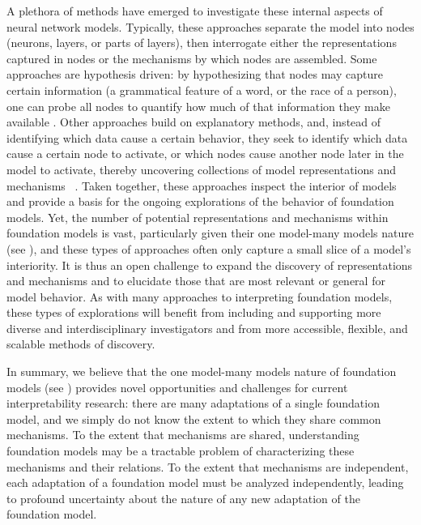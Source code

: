 A plethora of methods have emerged to investigate these internal aspects of neural network models. Typically, these approaches separate the model into nodes (\eg neurons, layers, or parts of layers), then interrogate either the representations captured in nodes or the mechanisms by which nodes are assembled. 
Some approaches are hypothesis driven: by hypothesizing that nodes may capture certain information (\eg a grammatical feature of a word, or the race of a person), one can probe all nodes to quantify how much of that information they make available \citep{alain2016understanding,veldhoen2016diagnostic,belinkov2017what,adi2017finegrained,conneau2018what,hewitt2019control,hewitt2019structural,voita2020informationtheoretic,pimentel2020information}. 
Other approaches build on explanatory methods, and, instead of identifying which data cause a certain behavior, they seek to identify which data cause a certain node to activate, or which nodes cause another node later in the model to activate, thereby uncovering collections of model representations and mechanisms
~\citep{olah2020zoom,mu2020compositional,carter2019activation,goh2021multimodal}.
Taken together, these approaches inspect the interior of models and provide a %
basis for the ongoing explorations of the behavior of foundation models. 
Yet, the number of potential representations and mechanisms within foundation models is vast, particularly given their one model-many models nature (see ), and these types of approaches often only capture a small slice of a model's interiority.
It is thus an open challenge to expand the discovery of representations and mechanisms and to elucidate those that are most relevant or general for model behavior.
As with many approaches to interpreting foundation models, these types of explorations will benefit from including and supporting more diverse and interdisciplinary investigators and from  more accessible, flexible, and scalable methods of discovery.


In summary, we believe that the one model-many models nature of foundation models (see ) provides novel opportunities and challenges for current interpretability research: there are many adaptations of a single foundation model, and we simply do not know the extent to which they share common mechanisms.
To the extent that mechanisms are shared, understanding foundation models may be a tractable problem of characterizing these mechanisms and their relations.
To the extent that mechanisms are independent, each adaptation of a foundation model must be analyzed independently, leading to profound uncertainty about the nature of any new adaptation of the foundation model.


